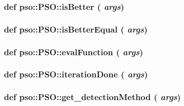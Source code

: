 \hypertarget{classpso_1_1PSO_720426c56c3c40a7aeb7025a9139742f}{
\subsubsection{\setlength{\rightskip}{0pt plus 5cm}def pso::PSO::isBetter ( {\em args})}}
\label{classpso_1_1PSO_720426c56c3c40a7aeb7025a9139742f}


\hypertarget{classpso_1_1PSO_3c529903fe714d9e6c5fe0f8d31891ac}{
\subsubsection{\setlength{\rightskip}{0pt plus 5cm}def pso::PSO::isBetterEqual ( {\em args})}}
\label{classpso_1_1PSO_3c529903fe714d9e6c5fe0f8d31891ac}


\hypertarget{classpso_1_1PSO_43d5c6fb841788547e854e96785c4556}{
\subsubsection{\setlength{\rightskip}{0pt plus 5cm}def pso::PSO::evalFunction ( {\em args})}}
\label{classpso_1_1PSO_43d5c6fb841788547e854e96785c4556}


\hypertarget{classpso_1_1PSO_a24e4aaf3ed6ca00076bb4b979cc402a}{
\subsubsection{\setlength{\rightskip}{0pt plus 5cm}def pso::PSO::iterationDone ( {\em args})}}
\label{classpso_1_1PSO_a24e4aaf3ed6ca00076bb4b979cc402a}


\hypertarget{classpso_1_1PSO_9aa3d6d58e2708d1c386c8d23815df73}{
\subsubsection{\setlength{\rightskip}{0pt plus 5cm}def pso::PSO::get\_\-detectionMethod ( {\em args})}}
\label{classpso_1_1PSO_9aa3d6d58e2708d1c386c8d23815df73}


